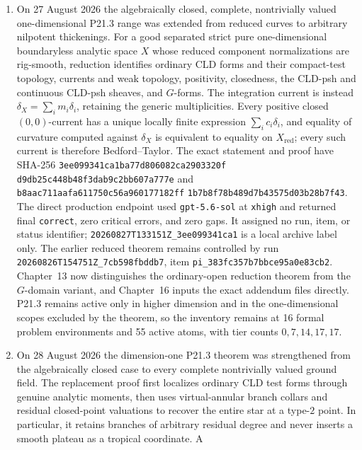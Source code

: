 \begin{enumerate}
  and header digests.  This post-integration gate does not enlarge the
  theorem's scope or retire either atom.
\item On 27 August 2026 the algebraically closed, complete, nontrivially
  valued one-dimensional P21.3 range was extended from reduced curves to
  arbitrary nilpotent thickenings.  For a good separated strict pure
  one-dimensional boundaryless analytic space \(X\) whose reduced component
  normalizations are rig-smooth, reduction identifies ordinary CLD forms and
  their compact-test topology, currents and weak topology, positivity,
  closedness, the CLD-psh and continuous CLD-psh sheaves, and \(G\)-forms.
  The integration current is instead
  \(\delta_X=\sum_i m_i\delta_i\), retaining the generic multiplicities.
  Every positive closed \((0,0)\)-current has a unique locally finite
  expression \(\sum_i c_i\delta_i\), and equality of curvature computed
  against \(\delta_X\) is equivalent to equality on \(X_{\mathrm{red}}\);
  every such current is therefore Bedford--Taylor.  The exact statement and
  proof have SHA-256
  \texttt{3ee099341ca1ba77d806082ca2903320f}
  \allowbreak\texttt{d9db25c448b48f3dab9c2bb607a777e} and
  \texttt{b8aac711aafa611750c56a960177182ff}
  \allowbreak\texttt{1b7b8f78b489d7b43575d03b28b7f43}.  The direct
  production endpoint used \texttt{gpt-5.6-sol} at \texttt{xhigh} and
  returned final \texttt{correct}, zero critical errors, and zero gaps.  It
  assigned no run, item, or status identifier;
  \texttt{20260827T133151Z\_3ee099341ca1} is a local archive label only.
  The earlier reduced theorem remains controlled by run
  \texttt{20260826T154751Z\_7cb598fbddb7}, item
  \texttt{pi\_383fc357b7bbce95a0e83cb2}.  Chapter~13 now distinguishes the
  ordinary-open reduction theorem from the \(G\)-domain variant, and
  Chapter~16 inputs the exact addendum files directly.  P21.3 remains active
  only in higher dimension and in the one-dimensional scopes excluded by the
  theorem, so the inventory remains at 16 formal problem environments and 55
  active atoms, with tier counts \(0,7,14,17,17\).
\item On 28 August 2026 the dimension-one P21.3 theorem was strengthened from
  the algebraically closed case to every complete nontrivially valued ground
  field.  The replacement proof first localizes ordinary CLD test forms
  through genuine analytic moments, then uses virtual-annular branch collars
  and residual closed-point valuations to recover the entire star at a
  type-\(2\) point.  In particular, it retains branches of arbitrary residual
  degree and never inserts a smooth plateau as a tropical coordinate.  A

\end{enumerate}
